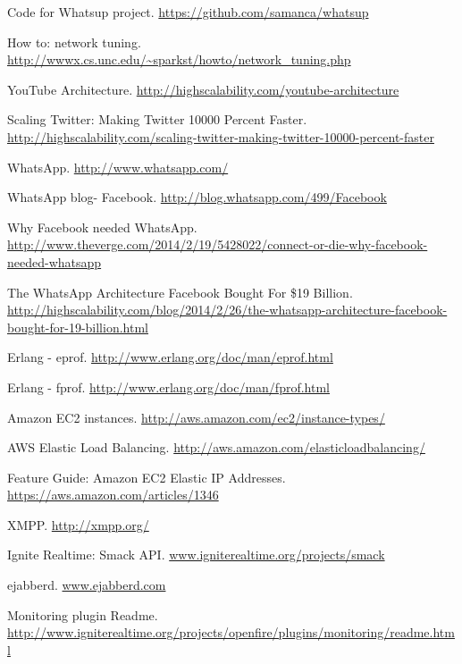 \documentclass[a4paper, twocolumn]{article}
\begin{document}
\begin{thebibliography}{9}

Code for Whatsup project. \url{https://github.com/samanca/whatsup}


How to: network tuning. \url{http://wwwx.cs.unc.edu/~sparkst/howto/network_tuning.php}

YouTube Architecture. \url{http://highscalability.com/youtube-architecture}

Scaling Twitter: Making Twitter 10000 Percent Faster. \url{http://highscalability.com/scaling-twitter-making-twitter-10000-percent-faster}

  WhatsApp. \url{http://www.whatsapp.com/}
  
  WhatsApp blog- Facebook. \url{http://blog.whatsapp.com/499/Facebook}
  
  Why Facebook needed WhatsApp. \url{http://www.theverge.com/2014/2/19/5428022/connect-or-die-why-facebook-needed-whatsapp}
  
The WhatsApp Architecture Facebook Bought For \$19 Billion. \url{http://highscalability.com/blog/2014/2/26/the-whatsapp-architecture-facebook-bought-for-19-billion.html}
  
  
  Erlang - eprof. \url{http://www.erlang.org/doc/man/eprof.html}
  
  Erlang - fprof. \url{http://www.erlang.org/doc/man/fprof.html}
  
  Amazon EC2 instances. \url{http://aws.amazon.com/ec2/instance-types/}

	AWS Elastic Load Balancing. \url{http://aws.amazon.com/elasticloadbalancing/}
    
Feature Guide: Amazon EC2 Elastic IP Addresses. \url{https://aws.amazon.com/articles/1346} 

 XMPP. \url{http://xmpp.org/}
 
 Ignite Realtime: Smack API. \url{www.igniterealtime.org/projects/smack}
  
	ejabberd. \url{www.ejabberd.com}
    
 	Monitoring plugin Readme. \url{http://www.igniterealtime.org/projects/openfire/plugins/monitoring/readme.html}
  

\end{thebibliography}
\end{document}
